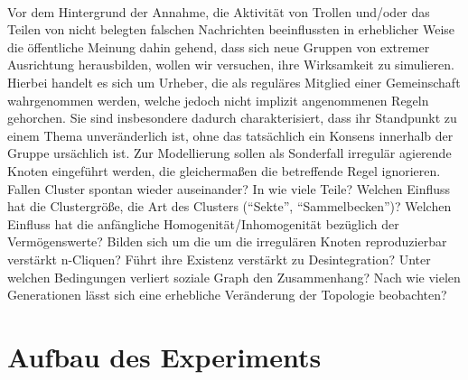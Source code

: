 \documentclass[11pt, a4paper]{scrartcl}
\begin{document}
\\
Vor dem Hintergrund der Annahme, die Aktivität von Trollen und/oder das Teilen von nicht belegten falschen Nachrichten beeinflussten in erheblicher Weise die öffentliche Meinung dahin gehend, dass sich neue Gruppen von  extremer Ausrichtung herausbilden, wollen wir versuchen, ihre Wirksamkeit zu simulieren.
\\
Hierbei handelt es sich um Urheber, die als reguläres Mitglied einer Gemeinschaft  wahrgenommen werden, welche jedoch nicht implizit angenommenen Regeln gehorchen. Sie sind insbesondere dadurch charakterisiert, dass ihr Standpunkt zu einem Thema unveränderlich ist, ohne das tatsächlich ein Konsens innerhalb der Gruppe ursächlich ist. Zur Modellierung sollen als Sonderfall irregulär agierende Knoten eingeführt werden, die gleichermaßen die betreffende Regel ignorieren.
\\
Fallen Cluster spontan wieder auseinander? In wie viele Teile? Welchen Einfluss hat die Clustergröße, die Art des Clusters ("`Sekte"', "`Sammelbecken"')?
Welchen Einfluss hat die anfängliche Homogenität/Inhomogenität bezüglich der Vermögenswerte? Bilden sich um die um die irregulären Knoten reproduzierbar verstärkt n-Cliquen? Führt ihre Existenz verstärkt zu Desintegration? Unter welchen Bedingungen verliert soziale Graph den Zusammenhang? Nach wie vielen Generationen lässt sich eine erhebliche Veränderung der Topologie beobachten?


\section{Aufbau des Experiments}
\end{document}
